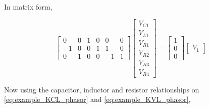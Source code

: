 \begin{example}
	In matrix form,

\begin{equation} %
%
	\left[\begin{array}{ccccccc}
	 0 &  0 &  1 & 0 & 0 & 0 \\[3mm]
	-1 &  0 &  0 & 1 & 1 & 0 \\[3mm]
	 0 &  1 &  0 & 0 &-1 & 1 
	\end{array}\right]
%
	\left[\begin{array}{c}
		V_{C1} \\[3mm] V_{L1} \\[3mm] V_{R1} \\[3mm] V_{R2} \\[3mm] V_{R3} \\[3mm] V_{R4}
	\end{array}\right] =
%
	\left[\begin{array}{c}
		1 \\[3mm] 0 \\[3mm] 0
	\end{array}\right]
%
	\left[\begin{array}{c}
		V_1
	\end{array}\right]\label{eq:example_KVL_phasor}
\end{equation} %

	Now using the capacitor, inductor and resistor relationships on \eqref{eq:example_KCL_phasor} and \eqref{eq:example_KVL_phasor},


\end{example}

